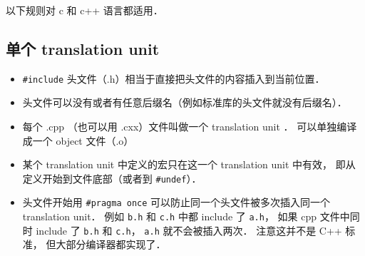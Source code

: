 

以下规则对 c 和 c++ 语言都适用．

\subsection{单个 translation unit}
\begin{itemize}
\item \verb|#include| 头文件（.h）相当于直接把头文件的内容插入到当前位置．
\item 头文件可以没有或者有任意后缀名（例如标准库的头文件就没有后缀名）．
\item 每个 .cpp （也可以用 .cxx）文件叫做一个 translation unit ． 可以单独编译成一个 object 文件（.o）
\item 某个 translation unit 中定义的宏只在这一个 translation unit 中有效， 即从定义开始到文件底部（或者到 \verb|#undef|）．
\item 头文件开始用 \verb|#pragma once| 可以防止同一个头文件被多次插入同一个 translation unit． 例如 \verb|b.h| 和 \verb|c.h| 中都 include 了 \verb|a.h|， 如果 cpp 文件中同时 include 了 \verb|b.h| 和 \verb|c.h|， \verb|a.h| 就不会被插入两次． 注意这并不是 C++ 标准， 但大部分编译器都实现了．
\end{itemize}

